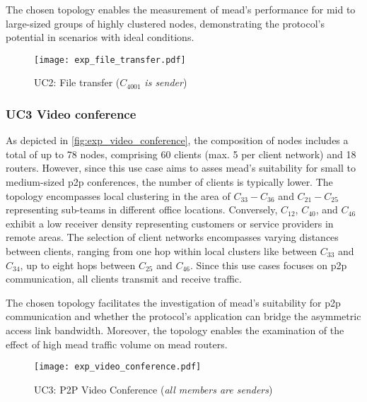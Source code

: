 The chosen topology enables the measurement of \gls{mead}'s performance for
    mid to large-sized groups of highly clustered nodes, demonstrating the
    protocol's potential in scenarios with ideal conditions.

\begin{figure}
    \begin{center}
        \texttt{[image: exp\_file\_transfer.pdf]}
    \end{center}
    \caption[UC2: File transfer]{UC2: File transfer ($C_{4001}$ \textit{is sender})}
    \label{fig:exp_file_transfer}
\end{figure}

\subsubsection{UC3 Video conference} %
\label{par:impl EX3 Video conference}
As depicted in \autoref{fig:exp_video_conference}, the composition of nodes
    includes a total of up to 78 nodes, comprising 60 clients (max. 5 per
    client network)
    and 18 routers.
However, since this use case aims to asses \gls{mead}'s suitability for small
    to medium-sized \gls{p2p} conferences, the number of clients is typically
    lower.
The topology encompasses local clustering in the area of $C_{33}-C_{36}$
    and $C_{21}-C_{25}$ representing sub-teams in different office locations.
Conversely, $C_{12}$, $C_{40}$, and $C_{46}$ exhibit a low receiver density
    representing customers or service providers in remote areas.
The selection of client networks encompasses varying distances between clients,
    ranging from one hop within local clusters like between $C_{33}$ and
    $C_{34}$, up to eight hops between $C_{25}$ and $C_{46}$.
Since this use cases focuses on \gls{p2p} communication, all clients transmit
    and receive traffic.

The chosen topology facilitates the investigation of \gls{mead}'s suitability
    for \gls{p2p} communication and whether the protocol's application can
    bridge the asymmetric access link bandwidth.
Moreover, the topology enables the examination of the effect of high \gls{mead}
    traffic volume on \gls{mead} routers.

\begin{figure}
    \begin{center}
        \texttt{[image: exp\_video\_conference.pdf]}
    \end{center}
    \caption[UC3: P2P Video Conference]{UC3: P2P Video Conference (\textit{all members are senders})}
    \label{fig:exp_video_conference}
\end{figure}

